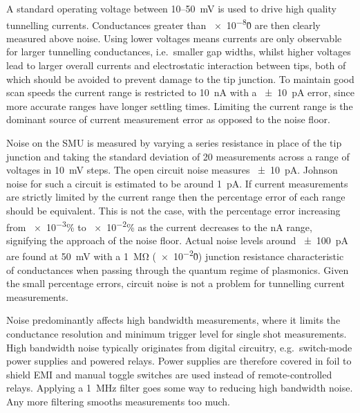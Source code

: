 \documentclass{article}
\begin{document}
A standard operating voltage between 10--\SI{50}{mV} is used to drive high quality tunnelling currents. Conductances greater than \num{e-8}\G0 are then clearly measured above noise. Using lower voltages means currents are only observable for larger tunnelling conductances, i.e.\ smaller gap widths, whilst higher voltages lead to larger overall currents and electrostatic interaction between tips, both of which should be avoided to prevent damage to the tip junction. To maintain good scan speeds the current range is restricted to \SI{10}{nA} with a \SI{\pm10}{pA} error, since more accurate ranges have longer settling times. Limiting the current range is the dominant source of current measurement error as opposed to the noise floor.

Noise on the SMU is measured by varying a series resistance in place of the tip junction and taking the standard deviation of 20 measurements across a range of voltages in \SI{10}{mV} steps. The open circuit noise measures \SI{\pm10}{pA}. Johnson noise for such a circuit is estimated to be around \SI{1}{pA}.
If current measurements are strictly limited by the current range then the percentage error of each range should be equivalent. This is not the case, with the percentage error increasing from \num{e-3}\% to \num{e-2}\% as the current decreases to the nA range, signifying the approach of the noise floor. Actual noise levels around \SI{\pm100}{pA} are found at \SI{50}{mV} with a \SI{1}{\mega\ohm} (\num{e-2}\G0) junction resistance characteristic of conductances when passing through the quantum regime of plasmonics. Given the small percentage errors, circuit noise is not a problem for tunnelling current measurements.

Noise predominantly affects high bandwidth measurements, where it limits the conductance resolution and minimum trigger level for single shot measurements. High bandwidth noise typically originates from digital circuitry, e.g.\ switch-mode power supplies and powered relays. Power supplies are therefore covered in foil to shield EMI and manual toggle switches are used instead of remote-controlled relays. Applying a \SI{1}{MHz} filter goes some way to reducing high bandwidth noise. Any more filtering smooths measurements too much.
\end{document}

